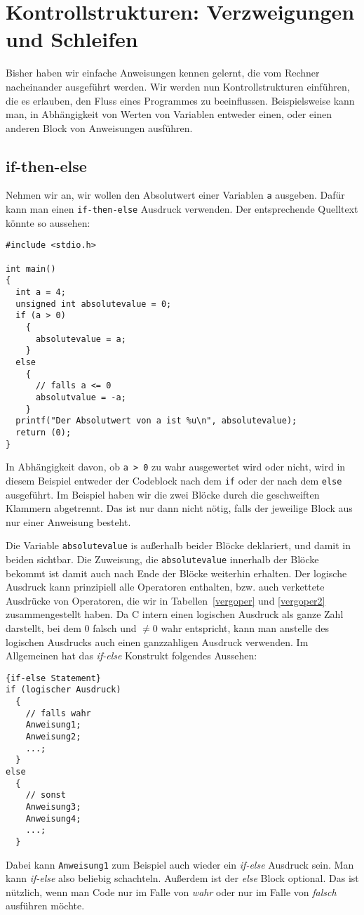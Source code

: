 \section{Kontrollstrukturen: Verzweigungen und Schleifen}

Bisher haben wir einfache Anweisungen kennen gelernt, die vom Rechner nacheinander ausgeführt werden.
Wir werden nun Kontrollstrukturen einführen, die es erlauben, den Fluss eines Programmes zu beeinflussen.
Beispielsweise kann man, in Abhängigkeit von Werten von Variablen entweder einen, oder einen anderen Block von Anweisungen ausführen.

\subsection{if-then-else}

Nehmen wir an, wir wollen den Absolutwert einer Variablen \verb|a| ausgeben.
Dafür kann man einen \verb|if-then-else| Ausdruck verwenden.
Der entsprechende Quelltext könnte so aussehen:
\begin{lstlisting}
#include <stdio.h>

int main()
{
  int a = 4;
  unsigned int absolutevalue = 0;
  if (a > 0)
    {
      absolutevalue = a;
    }
  else
    {
      // falls a <= 0
      absolutvalue = -a;
    }
  printf("Der Absolutwert von a ist %u\n", absolutevalue);
  return (0);
}
\end{lstlisting}
In Abhängigkeit davon, ob \verb|a > 0| zu wahr ausgewertet wird oder nicht, wird in diesem Beispiel entweder der Codeblock nach dem \verb|if| oder der nach dem \verb|else| ausgeführt.
Im Beispiel haben wir die zwei Blöcke durch die geschweiften Klammern abgetrennt. 
Das ist nur dann nicht nötig, falls der jeweilige Block aus nur einer Anweisung besteht.

Die Variable \verb|absolutevalue| is außerhalb beider Blöcke deklariert, und damit in beiden sichtbar.
Die Zuweisung, die \verb|absolutevalue| innerhalb der Blöcke bekommt ist damit auch nach Ende der Blöcke weiterhin erhalten.
Der logische Ausdruck kann prinzipiell alle Operatoren enthalten, bzw. auch verkettete Ausdrücke von Operatoren, die wir in Tabellen~\ref{vergoper} und \ref{vergoper2} zusammengestellt haben.
Da C intern einen logischen Ausdruck als ganze Zahl darstellt, bei dem $0$ falsch und $\neq 0$ wahr entspricht, kann man anstelle des logischen Ausdrucks auch einen ganzzahligen Ausdruck verwenden.
Im Allgemeinen hat das \emph{if-else} Konstrukt folgendes Aussehen:
\begin{lstlisting}{if-else Statement}
if (logischer Ausdruck)
  {
    // falls wahr
    Anweisung1;
    Anweisung2;
    ...;
  }
else
  {
    // sonst
    Anweisung3;
    Anweisung4;
    ...;
  }
\end{lstlisting}
Dabei kann \verb|Anweisung1| zum Beispiel auch wieder ein \emph{if-else} Ausdruck sein. 
Man kann \emph{if-else} also beliebig schachteln.
Außerdem ist der \emph{else} Block optional.
Das ist nützlich, wenn man Code nur im Falle von \emph{wahr} oder nur im Falle von \emph{falsch} ausführen möchte.

